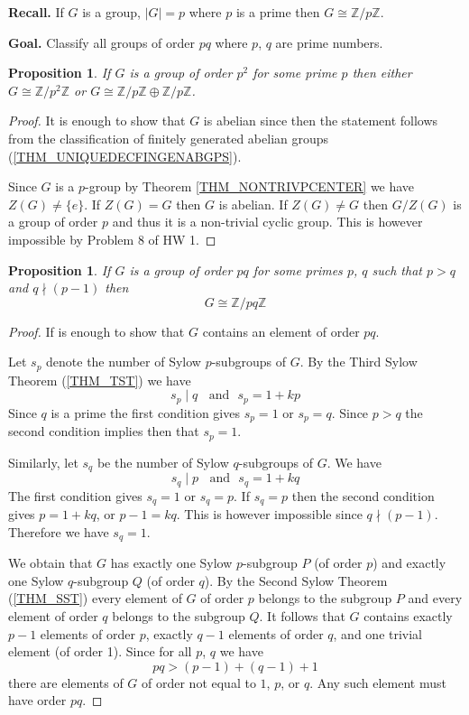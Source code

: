 \documentclass[12pt, letterpaper, oneside]{article}
\theoremstyle{plain}
\newtheorem{proposition}[theorem]{Proposition}
\theoremstyle{definition}
\newcommand{\Z}{{\mathbb Z}}
\newcommand{\vs}{\vskip 5mm}
\begin{document}
\textbf{Recall.} If $G$ is a group, $|G| = p$ where $p$ is a prime then $G\cong \Z/p\Z$.

\vs

\textbf{Goal.} Classify all groups of order $pq$ where $p$, $q$ are prime numbers.


\vs\vs

\begin{proposition}
If $G$ is a group of order $p^{2}$ for some prime $p$ then either $G\cong \Z/p^{2}\Z$ or 
$G \cong \Z/p\Z\oplus \Z/p\Z$.
\end{proposition}


\vs

\begin{proof}
It is enough to show that $G$ is abelian since then the statement follows from the classification of 
finitely generated abelian groups (\ref{THM_UNIQUEDECFINGENABGPS}). 


Since $G$ is  a $p$-group by Theorem \ref{THM_NONTRIVPCENTER} we have $Z(G)\neq \{e\}$.
If $Z(G) = G$ then  $G$ is abelian. If $Z(G)\neq G$ then $G/Z(G)$ is a group of order $p$ and thus 
it is a non-trivial cyclic group. This is however impossible by Problem 8 of HW 1.
\end{proof}

\vs\vs

\begin{proposition}
\label{PROP_PQGPSNONDIV}
If $G$ is a group of order $pq$ for some primes $p$, $q$ such that $p>q$ and $q\nmid (p-1)$
then 
$$G\cong \Z/pq\Z$$ 
\end{proposition}


\vs

\begin{proof}
If is enough to show that $G$ contains an element of order $pq$.

Let $s_{p}$ denote the number of Sylow $p$-subgroups of $G$. By the Third Sylow Theorem 
(\ref{THM_TST}) we have 
$$s_{p} \mid q \ \ \ \ \text{and} \ \ \ s_{p} = 1  + kp$$ 
Since $q$ is a prime the first condition gives $s_{p} = 1$ or $s_{p} = q$. Since $p>q$ the second 
condition implies then that $s_{p}=1$.

Similarly, let $s_{q}$ be the number of Sylow $q$-subgroups of $G$. We have
$$s_{q} \mid p \ \ \ \ \text{and} \ \ \ s_{q} = 1  + kq$$
The first condition gives $s_{q} =1$ or $s_{q}=p$. If $s_{q} =p$ then the second condition 
gives $p= 1+kq$, or  $p-1 = kq$. This is however impossible since $q\nmid (p-1)$. Therefore 
we have $s_{q} =1$. 


We obtain that  $G$ has exactly one Sylow $p$-subgroup $P$ (of order $p$) and 
exactly one Sylow $q$-subgroup $Q$ (of order $q$). By the Second Sylow Theorem (\ref{THM_SST}) 
every element of $G$ of order $p$ belongs to the subgroup $P$ and every element of order $q$ 
belongs to the subgroup $Q$.  It follows that $G$ contains exactly $p-1$ elements of order $p$, 
exactly $q-1$ elements of order $q$, and one trivial element (of order 1). Since for all $p$, $q$
we have 
$$pq > (p-1) + (q-1) +1 $$
there are elements of $G$ of order not equal to $1$, $p$, or $q$. Any such element must have 
order $pq$.

\end{proof}
\end{document}
